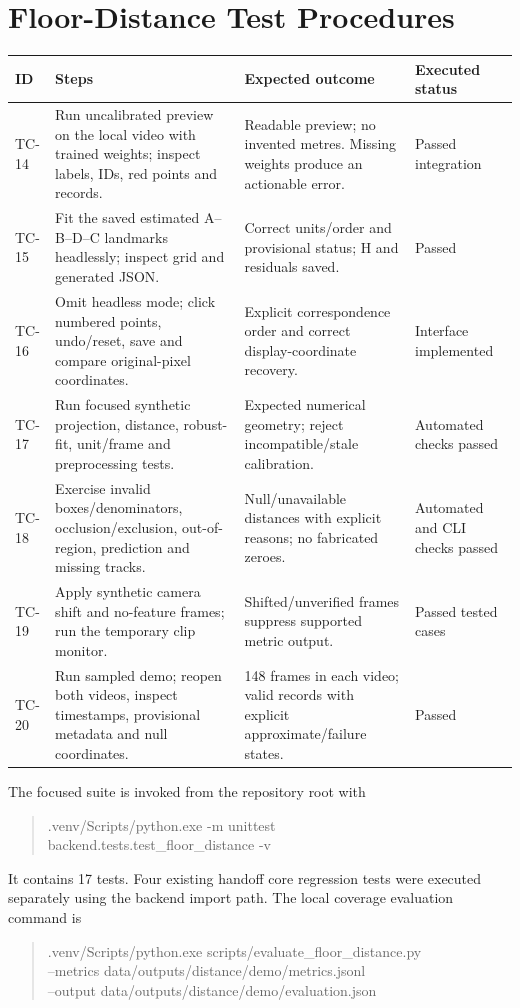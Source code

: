 \section{Floor-Distance Test Procedures}
\begin{longtable}{P{0.09\textwidth}P{0.35\textwidth}P{0.30\textwidth}P{0.14\textwidth}}
\toprule
ID & Steps & Expected outcome & Executed status\\
\midrule
\endhead
TC-14 & Run uncalibrated preview on the local video with trained weights; inspect labels, IDs, red points and records. & Readable preview; no invented metres. Missing weights produce an actionable error. & Passed integration\\
TC-15 & Fit the saved estimated A--B--D--C landmarks headlessly; inspect grid and generated JSON. & Correct units/order and provisional status; H and residuals saved. & Passed\\
TC-16 & Omit headless mode; click numbered points, undo/reset, save and compare original-pixel coordinates. & Explicit correspondence order and correct display-coordinate recovery. & Interface implemented\\
TC-17 & Run focused synthetic projection, distance, robust-fit, unit/frame and preprocessing tests. & Expected numerical geometry; reject incompatible/stale calibration. & Automated checks passed\\
TC-18 & Exercise invalid boxes/denominators, occlusion/exclusion, out-of-region, prediction and missing tracks. & Null/unavailable distances with explicit reasons; no fabricated zeroes. & Automated and CLI checks passed\\
TC-19 & Apply synthetic camera shift and no-feature frames; run the temporary clip monitor. & Shifted/unverified frames suppress supported metric output. & Passed tested cases\\
TC-20 & Run sampled demo; reopen both videos, inspect timestamps, provisional metadata and null coordinates. & 148 frames in each video; valid records with explicit approximate/failure states. & Passed\\
\bottomrule
\end{longtable}
The focused suite is invoked from the repository root with
\begin{quote}\small\ttfamily
.venv/Scripts/python.exe -m unittest\\
\hspace*{1em}backend.tests.test\_floor\_distance -v
\end{quote}
It contains 17 tests. Four existing handoff core regression tests were executed separately using the backend import path. The local coverage evaluation command is
\begin{quote}\small\ttfamily
.venv/Scripts/python.exe scripts/evaluate\_floor\_distance.py\\
\hspace*{1em}--metrics data/outputs/distance/demo/metrics.jsonl\\
\hspace*{1em}--output data/outputs/distance/demo/evaluation.json
\end{quote}
